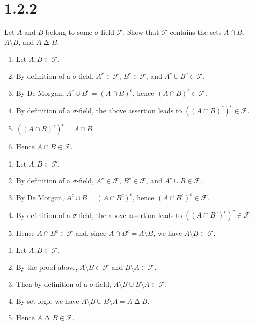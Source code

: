 \section*{1.2.2}
Let $A$ and $B$ belong to some $\sigma$-field $\mathcal F$.
Show that $\mathcal F$ contains the sets $A\cap B$, $A\setminus B$,
and $A\mathbin{\Delta}B$.

\medskip
\begin{enumerate}
\item Let $A,B\in\mathcal F$.
\item By definition of a $\sigma$-field,
$A^c\in\mathcal F$,
$B^c\in\mathcal F$,
and $A^c\cup B^c\in\mathcal F$.
\item By De Morgan, $A^c\cup B^c=(A\cap B)^c$, hence
$(A\cap B)^c\in\mathcal F$.
\item By definition of a $\sigma$-field, the above assertion leads to
$((A\cap B)^c)^c\in\mathcal F$.
\item $((A\cap B)^c)^c=A\cap B$
\item Hence $A\cap B\in\mathcal F$.
\end{enumerate}

\medskip
\begin{enumerate}
\item Let $A,B\in\mathcal F$.
\item By definition of a $\sigma$-field,
$A^c\in\mathcal F$,
$B^c\in\mathcal F$,  and
$A^c\cup B\in\mathcal F$.
\item By De Morgan, $A^c\cup B=(A\cap B^c)^c$, hence
$(A\cap B^c)^c\in\mathcal F$.
\item By definition of a $\sigma$-field,
the above assertion leads to $((A\cap B^c)^c)^c\in\mathcal F$.
\item Hence $A\cap B^c\in\mathcal F$ and, since
$A\cap B^c=A\setminus B$, we have $A\setminus B\in\mathcal F$.
\end{enumerate}

\medskip
\begin{enumerate}
\item Let $A,B\in\mathcal F$.
\item By the proof above, $A\setminus B\in\mathcal F$
and $B\setminus A\in\mathcal F$.
\item Then by definition of a $\sigma$-field,
$A\setminus B\cup B\setminus A\in\mathcal F$.
\item By set logic we have $A\setminus B\cup B\setminus A=A\mathbin{\Delta}B$.
\item Hence $A\mathbin{\Delta}B\in\mathcal F$.
\end{enumerate}
